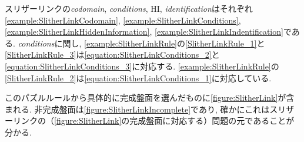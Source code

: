 \begin{example}[スリザーリンクの数学的記述]
  スリザーリンクの\textit{codomain}, \textit{conditions}, HI, \textit{identification}はそれぞれ\cref{example:SlitherLinkCodomain}, \cref{example:SlitherLinkConditions}, \cref{example:SlitherLinkHiddenInformation}, \cref{example:SlitherLinkIndentification}である. \textit{conditions}に関し, \cref{example:SlitherLinkRule}の\ref{SlitherLinkRule_1}と\ref{SlitherLinkRule_3}は\cref{equation:SlitherLinkConditions_2}と\cref{equation:SlitherLinkConditions_3}に対応する. \cref{example:SlitherLinkRule}の\ref{SlitherLinkRule_2}は\cref{equation:SlitherLinkConditions_1}に対応している.

  このパズルルールから具体的に完成盤面を選んだものに\cref{figure:SlitherLink}が含まれる. 非完成盤面は\cref{figure:SlitherLinkIncomplete}であり, 確かにこれはスリザーリンクの（\cref{figure:SlitherLink}の完成盤面に対応する）問題の元であることが分かる.
\end{example}

